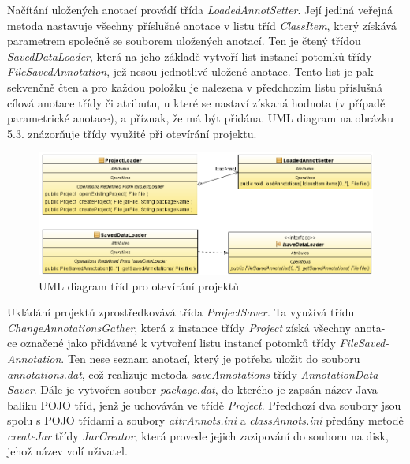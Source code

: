 \documentclass{projekt}
\begin{document}
Načítání uložených anotací provádí třída {\it LoadedAnnotSetter}. Její jediná veřejná metoda nastavuje všechny příslušné anotace v listu tříd {\it ClassItem}, který získává parametrem společně se souborem uložených anotací. Ten je čtený třídou {\it SavedDataLoader}, která na jeho základě vytvoří list instancí potomků třídy {\it FileSavedAnnotation}, jež nesou jednotlivé uložené anotace. Tento list je pak sekvenčně čten a pro každou položku je nalezena v předchozím listu příslušná cílová anotace třídy či atributu, u které se nastaví získaná hodnota (v případě parametrické anotace), a příznak, že má být přidána. UML diagram na obrázku 5.3. znázorňuje třídy využité při otevírání projektu.
\begin{figure}[htb!]
\begin{center}
\includegraphics[scale=0.38]{Aplikacni2.png}
\caption{UML diagram tříd pro otevírání projektů}
\end{center}
\end{figure}\newline
Ukládání projektů zprostředkovává třída {\it ProjectSaver.} Ta využívá třídu {\it ChangeAnnotationsGather}, která z instance třídy {\it Project} získá všechny anota-\\ce označené jako přidávané k vytvoření listu instancí potomků třídy {\it FileSaved-\\Annotation}. Ten nese seznam anotací, který je potřeba uložit do souboru {\it annotations.dat}, což realizuje metoda {\it saveAnnotations} třídy {\it AnnotationData-\\Saver}. Dále je vytvořen soubor {\it package.dat}, do kterého je zapsán název Java balíku POJO tříd, jenž je uchováván ve třídě {\it Project}. Předchozí dva soubory jsou spolu s POJO třídami a soubory {\it attrAnnots.ini} a {\it classAnnots.ini} předány metodě {\it createJar} třídy {\it JarCreator}, která provede jejich zazipování do souboru na disk, jehož název volí uživatel.
\end{document}
